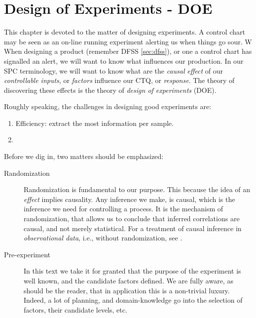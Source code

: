 \chapter[DOE]{Design of Experiments - DOE}

This chapter is devoted to the matter of designing experiments.
A control chart may be seen as an on-line running experiment alerting us when things go sour. W
When designing a product (remember DFSS \ref{sec:dfss}), or one a control chart has signalled an alert, we will want to know what influences our production.
In our SPC terminology, we will want to know what are the \emph{causal} \emph{effect} of our \emph{controllable inputs}, or \emph{factors} influence our CTQ, or \emph{response}. 
The theory of discovering these effects is the theory of \emph{design of experiments} (DOE).

Roughly speaking, the challenges in designing good experiments are:
\begin{enumerate}
\item Efficiency: extract the most information per sample.
\item 
\end{enumerate}


Before we dig in, two matters should be emphasized:
\begin{description}
\item [Randomization] Randomization is fundamental to our purpose. This because the idea of an \emph{effect} implies causality. Any inference we make, is causal, which is the inference we need for controlling a process.
It is the mechanism of randomization, that allows us to conclude that inferred correlations are causal, and not merely statistical.
For a treatment of causal inference in \emph{observational data}, i.e., without randomization, see \cite{rosenbaum_observational_2002}.

\item [Pre-experiment] In this text we take it for granted that the purpose of the experiment is well known, and the candidate factors defined. We are fully aware, as should be the reader, that in application this is a non-trivial luxury. Indeed, a lot of planning, and domain-knowledge go into the selection of factors, their candidate levels, etc.

\end{description}



